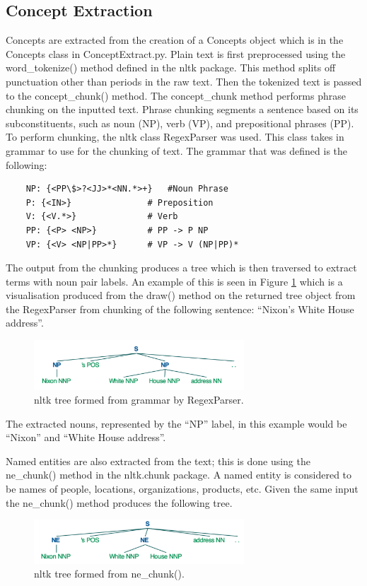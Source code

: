 \subsection{Concept Extraction}
Concepts are extracted from the creation of a Concepts object which is in the Concepts class in ConceptExtract.py. Plain text is first preprocessed using the word\_tokenize() method defined in the nltk package. This method splits off punctuation other than periods in the raw text. Then the tokenized text is passed to the concept\_chunk() method. The concept\_chunk method performs phrase chunking on the inputted text. Phrase chunking segments a sentence based on its subconstituents, such as noun (NP), verb (VP), and prepositional phrases (PP).  To perform chunking, the nltk class RegexParser was used. This class takes in grammar to use for the chunking of text. The grammar that was defined is the following:

\begin{lstlisting}
    NP: {<PP\$>?<JJ>*<NN.*>+}	#Noun Phrase
    P: {<IN>}				# Preposition
    V: {<V.*>}				# Verb
    PP: {<P> <NP>}			# PP -> P NP
    VP: {<V> <NP|PP>*}		# VP -> V (NP|PP)*
\end{lstlisting}

The output from the chunking produces a tree which is then traversed to extract terms with noun pair labels. An example of this is seen in Figure \ref{tree} which is a visualisation produced from the draw() method on the returned tree object from the RegexParser from chunking of the following sentence: “Nixon’s White House address”.
\begin{figure}[h]
    \centering
         \includegraphics[width=0.70\textwidth]{Figures/tree.png}
          \caption{nltk tree formed from grammar by RegexParser.}
           \label{tree}
\end{figure}

The extracted nouns, represented by the “NP” label, in this example would be “Nixon” and “White House address”.

Named entities are also extracted from the text; this is done using the ne\_chunk() method in the nltk.chunk package. A named entity is considered to be names of people, locations, organizations, products, etc. Given the same input the ne\_chunk() method produces the following tree.
\begin{figure}[h]
    \centering
         \includegraphics[width=0.70\textwidth]{Figures/treeNE.png}
          \caption{nltk tree formed from ne\_chunk().}
           \label{treeNE}
\end{figure}

